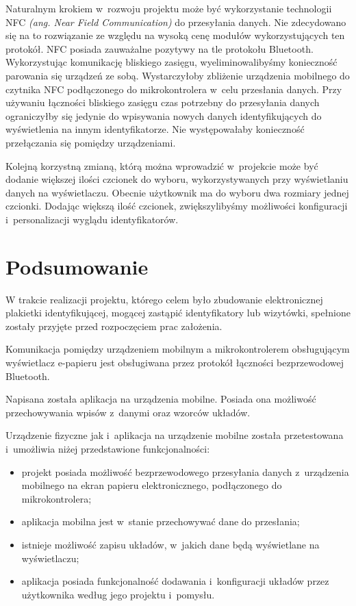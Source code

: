 \documentclass[a4paper,12pt, twoside]{article}
\begin{document}
        Naturalnym krokiem w~rozwoju projektu może być wykorzystanie technologii NFC \textit{(ang. Near Field Communication)} do przesyłania danych. Nie zdecydowano się na to rozwiązanie ze względu na wysoką cenę modułów wykorzystujących ten protokół. NFC posiada zauważalne pozytywy na tle protokołu Bluetooth. Wykorzystując komunikację bliskiego zasięgu, wyeliminowalibyśmy konieczność parowania się urządzeń ze sobą. Wystarczyłoby zbliżenie urządzenia mobilnego do czytnika NFC podłączonego do mikrokontrolera w~celu przesłania danych. Przy używaniu łączności bliskiego zasięgu czas potrzebny do przesyłania danych ograniczyłby się jedynie do wpisywania nowych danych identyfikujących do wyświetlenia na innym identyfikatorze. Nie występowałaby konieczność przełączania się pomiędzy urządzeniami.
    	
    	Kolejną korzystną zmianą, którą można wprowadzić w~projekcie może być dodanie większej ilości czcionek do wyboru, wykorzystywanych przy wyświetlaniu danych na wyświetlaczu. Obecnie użytkownik ma do wyboru dwa rozmiary jednej czcionki. Dodając większą ilość czcionek, zwiększylibyśmy możliwości konfiguracji i~personalizacji wyglądu identyfikatorów.

    	\section{Podsumowanie}
    	W trakcie realizacji projektu, którego celem było zbudowanie elektronicznej plakietki identyfikującej, mogącej zastąpić identyfikatory lub wizytówki, spełnione zostały przyjęte przed rozpoczęciem prac założenia.
    	
    	Komunikacja pomiędzy urządzeniem mobilnym a mikrokontrolerem obsługującym wyświetlacz e-papieru jest obsługiwana przez protokół łączności bezprzewodowej Bluetooth.
    	
    	Napisana została aplikacja na urządzenia mobilne. Posiada ona możliwość przechowywania wpisów z~danymi oraz wzorców układów.
    	
    	Urządzenie fizyczne jak i~aplikacja na urządzenie mobilne została przetestowana i~umożliwia niżej przedstawione funkcjonalności:
    	\begin{itemize}
    	    \item projekt posiada możliwość bezprzewodowego przesyłania danych z~urządzenia mobilnego na ekran papieru elektronicznego, podłączonego do mikrokontrolera;
    	    \item aplikacja mobilna jest w~stanie przechowywać dane do przesłania;
    	    \item istnieje możliwość zapisu układów, w~jakich dane będą wyświetlane na wyświetlaczu;
    	    \item aplikacja posiada funkcjonalność dodawania i~konfiguracji układów przez użytkownika według jego projektu i~pomysłu.
    	\end{itemize}
    	
\end{document}
